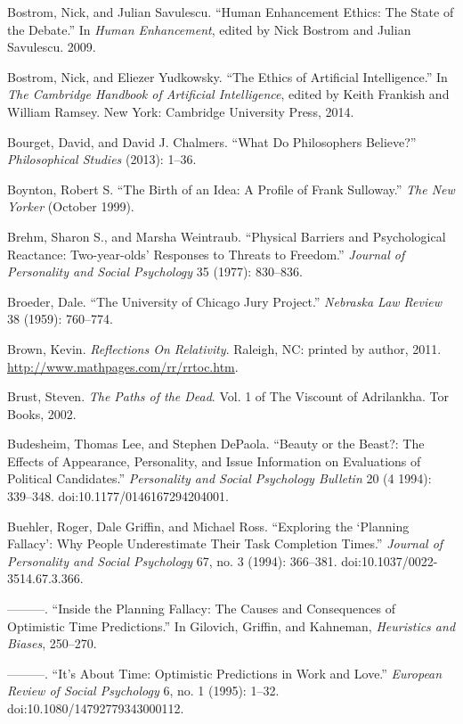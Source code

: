 \documentclass[letterpaper]{book}
\begin{document}
{
 Bostrom, Nick, and Julian Savulescu. ``Human
Enhancement Ethics: The State of the Debate.'' In
\textit{Human Enhancement}, edited by Nick Bostrom and Julian
Savulescu. 2009.}

{
 Bostrom, Nick, and Eliezer Yudkowsky. ``The
Ethics of Artificial Intelligence.'' In \textit{The
Cambridge Handbook of Artificial Intelligence}, edited by Keith
Frankish and William Ramsey. New York: Cambridge University Press,
2014.}

{
 Bourget, David, and David J. Chalmers. ``What Do
Philosophers Believe?'' \textit{Philosophical
Studies} (2013): 1--36.}

{
 Boynton, Robert S. ``The Birth of an Idea: A
Profile of Frank Sulloway.'' \textit{The New Yorker}
(October 1999).}

{
 Brehm, Sharon S., and Marsha Weintraub.
``Physical Barriers and Psychological Reactance:
Two-year-olds' Responses to Threats to
Freedom.'' \textit{Journal of Personality and Social
Psychology} 35 (1977): 830--836.}

{
 Broeder, Dale. ``The University of Chicago Jury
Project.'' \textit{Nebraska Law Review} 38 (1959):
760--774.}

{
 Brown, Kevin. \textit{Reflections On Relativity}. Raleigh, NC:
printed by author, 2011. \url{http://www.mathpages.com/rr/rrtoc.htm}.}

{
 Brust, Steven. \textit{The Paths of the Dead}. Vol. 1 of The
Viscount of Adrilankha. Tor Books, 2002.}

{
 Budesheim, Thomas Lee, and Stephen DePaola.
``Beauty or the Beast?: The Effects of Appearance,
Personality, and Issue Information on Evaluations of Political
Candidates.'' \textit{Personality and Social
Psychology Bulletin} 20 (4 1994): 339--348.
doi:10.1177/0146167294204001.}

{
 Buehler, Roger, Dale Griffin, and Michael Ross.
``Exploring the `Planning
Fallacy': Why People Underestimate Their Task
Completion Times.'' \textit{Journal of Personality
and Social Psychology} 67, no. 3 (1994): 366--381.
doi:10.1037/0022-3514.67.3.366.}

{
 {}---{}---{}---. ``Inside the Planning Fallacy:
The Causes and Consequences of Optimistic Time
Predictions.'' In Gilovich, Griffin, and Kahneman,
\textit{Heuristics and Biases}, 250--270.}

{
 {}---{}---{}---. ``It's About
Time: Optimistic Predictions in Work and Love.''
\textit{European Review of Social Psychology} 6, no. 1 (1995): 1--32.
doi:10.1080/14792779343000112.}
\end{document}
